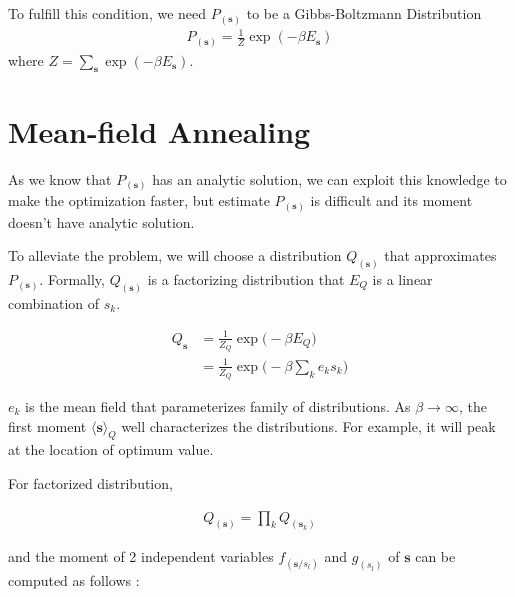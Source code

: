 To fulfill this condition, we need $P_{(\boldsymbol{s})}$ to be a Gibbs-Boltzmann Distribution
\begin{align*}
	P_{(\boldsymbol{s})} = \frac{1}{Z} \exp{( -\beta E_{\boldsymbol{s}} )} 
\end{align*}
where $Z = \sum_{\boldsymbol{s}} \exp{(-\beta E_{\boldsymbol{s}})}$.

\section{Mean-field Annealing}
As we know that $P_{(\boldsymbol{s})}$ has an analytic solution, we can exploit this knowledge to make the optimization faster, but estimate $P_{(\boldsymbol{s})}$ is difficult and its moment doesn't have analytic solution. 

To alleviate the problem, we will choose a distribution $Q_{(\boldsymbol{s})}$ that approximates $P_{(\boldsymbol{s})}$. Formally, $Q_{(\boldsymbol{s})}$ is a factorizing distribution that $E_Q$ is a linear combination of $s_k$. 

\begin{align*}
	Q_{\boldsymbol{s}} &= \frac{1}{Z_Q} \exp{ \Bigg ( - \beta E_Q  \Bigg )}   \\
	&= \frac{1}{Z_Q} \exp{ \Bigg ( - \beta \sum_{k} e_k s_k  \Bigg )}  
\end{align*}

$e_k$ is the mean field that parameterizes family of distributions. As $\beta \rightarrow \infty$, the first moment $\langle \boldsymbol{s} \rangle_{Q}$ well characterizes the distributions. For example, it will peak at the location of optimum value.

For factorized distribution, 

\begin{align*}
	Q_{(\boldsymbol{s})} = \prod_k Q_{(\boldsymbol{s}_k)}
\end{align*}

and the moment of 2 independent variables $f_{(\boldsymbol{s} / s_l) }$ and $g_{(s_l)}$ of $\boldsymbol{s}$ can be computed as follows :


